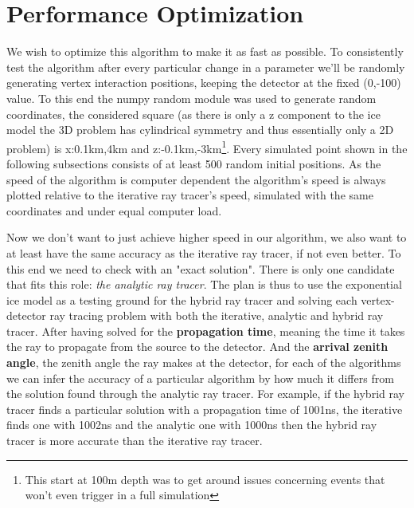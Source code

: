 \section{Performance Optimization} 
We wish to optimize this algorithm to make
it as fast as possible.  To consistently test the algorithm after every
particular change in a parameter we'll be randomly generating vertex
interaction positions, keeping the detector at the fixed (0,-100) value.  To
this end the numpy random module was used to generate random coordinates, the
considered square (as there is only a z component to the ice model the 3D
problem has cylindrical symmetry and thus essentially only a 2D problem) is
x:0.1km,4km and z:-0.1km,-3km\footnote{This start at 100m depth was to get
around issues concerning events that won't even trigger in a full simulation}.
Every simulated point shown in the following subsections consists of at least
500 random initial positions.  As the speed of the algorithm is computer
dependent the algorithm's speed is always plotted relative to the iterative ray
tracer's speed, simulated with the same coordinates and under equal computer load.

Now we don't want to just achieve higher speed in our algorithm, we also want
to at least have the same accuracy as the iterative ray tracer, if not even better.
To this end we need to check with an "exact solution". There is only one candidate
that fits this role: \textit{the analytic ray tracer}. The plan is thus to use the
exponential ice model as a testing ground for the hybrid ray tracer and solving each
vertex-detector ray tracing problem with both the iterative, analytic and hybrid ray tracer.
After having solved for the \textbf{propagation time}, meaning the time it takes the ray to
propagate from the source to the detector. And the \textbf{arrival zenith angle}, the zenith angle
the ray makes at the detector, for each of the algorithms we can infer the accuracy of a particular
algorithm by how much it differs from the solution found through the analytic ray tracer.
For example, if the hybrid ray tracer finds a particular solution with a propagation time of 
1001ns, the iterative finds one with 1002ns and the analytic one with 1000ns then the hybrid
ray tracer is more accurate than the iterative ray tracer.
